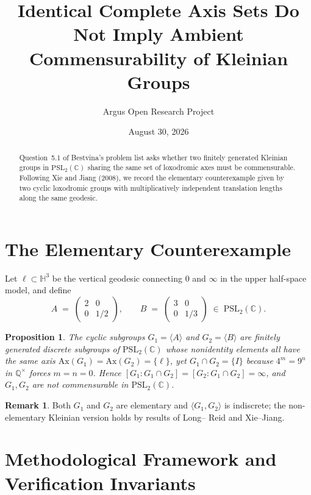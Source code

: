 \documentclass[10pt,reqno]{amsart}
\title[Identical Complete Axis Sets Do Not Imply Commensurability]
{Identical Complete Axis Sets Do Not Imply Ambient Commensurability of Kleinian Groups}
\author{Argus Open Research Project}
\date{August 30, 2026}
\newtheorem{proposition}[theorem]{Proposition}
\theoremstyle{definition}
\newtheorem{remark}[theorem]{Remark}
\begin{document}
\begin{abstract}
Question~5.1 of Bestvina's problem list asks whether two finitely generated Kleinian groups in $\mathrm{PSL}_2(\mathbb{C})$ sharing the same set of loxodromic axes must be commensurable. Following Xie and Jiang (2008), we record the elementary counterexample given by two cyclic loxodromic groups with multiplicatively independent translation lengths along the same geodesic.
\end{abstract}
\maketitle
\section{The Elementary Counterexample}
Let $\ell\subset\mathbb{H}^3$ be the vertical geodesic connecting $0$ and $\infty$ in the upper half-space model, and define
\[
  A \;=\; \begin{pmatrix} 2 & 0 \\ 0 & 1/2 \end{pmatrix},
  \qquad
  B \;=\; \begin{pmatrix} 3 & 0 \\ 0 & 1/3 \end{pmatrix} \;\in\; \mathrm{PSL}_2(\mathbb{C}).
\]
\begin{proposition}
The cyclic subgroups $G_1=\langle A\rangle$ and $G_2=\langle B\rangle$ are finitely generated discrete subgroups of $\mathrm{PSL}_2(\mathbb{C})$ whose nonidentity elements all have the same axis $\mathrm{Ax}(G_1)=\mathrm{Ax}(G_2)=\{\ell\}$, yet $G_1\cap G_2 = \{I\}$ because $4^m = 9^n$ in $\mathbb{Q}^\times$ forces $m=n=0$. Hence $[G_1:G_1\cap G_2]=[G_2:G_1\cap G_2]=\infty$, and $G_1,G_2$ are not commensurable in $\mathrm{PSL}_2(\mathbb{C})$.
\end{proposition}
\begin{remark}
Both $G_1$ and $G_2$ are elementary and $\langle G_1,G_2\rangle$ is indiscrete; the non-elementary Kleinian version holds by results of Long-- Reid and Xie--Jiang.
\end{remark}

\section{Methodological Framework and Verification Invariants}
\end{document}
